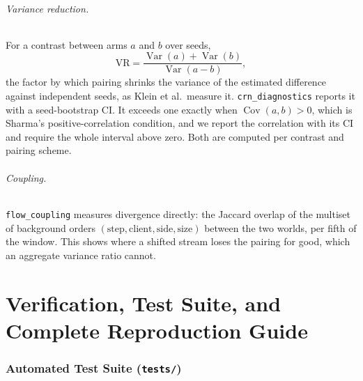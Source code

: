 \documentclass[11pt,a4paper]{article}
\newcommand{\code}[1]{\texttt{#1}}
\newcommand{\Var}{\operatorname{Var}}
\begin{document}
\paragraph{Variance reduction.} For a contrast between arms $a$ and $b$ over seeds,
\[
  \text{VR} = \frac{\Var(a) + \Var(b)}{\Var(a - b)},
\]
the factor by which pairing shrinks the variance of the estimated difference against independent seeds, as Klein et al.\ measure it.
\code{crn\_diagnostics} reports it with a seed-bootstrap CI. It exceeds one exactly when $\operatorname{Cov}(a, b) > 0$, which is Sharma's
positive-correlation condition, and we report the correlation with its CI and require the whole interval above zero. Both are computed per
contrast and pairing scheme.

\paragraph{Coupling.} \code{flow\_coupling} measures divergence directly: the Jaccard overlap of the multiset of background orders
$(\text{step}, \text{client}, \text{side}, \text{size})$ between the two worlds, per fifth of the window. This shows where a shifted stream
loses the pairing for good, which an aggregate variance ratio cannot.

\part{Verification, Test Suite, and Complete Reproduction Guide}
\label{part:four}

\section{Automated Test Suite (\code{tests/})}
\label{sec:tests}
\end{document}
